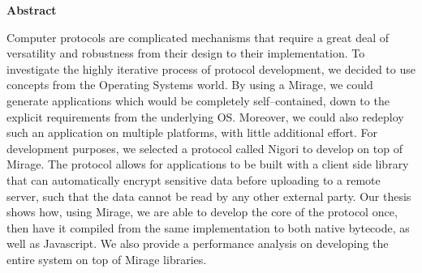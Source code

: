 \newpage
{\Huge \bf Abstract}
\vspace{24pt}

Computer protocols are complicated mechanisms that require a great deal of versatility and robustness from their design to their implementation.
To investigate the highly iterative process of protocol development, we decided to use concepts from the Operating Systems world.
By using a Mirage, we could generate applications which would be completely self--contained, down to the explicit requirements from the underlying OS.
Moreover, we could also redeploy such an application on multiple platforms, with little additional effort.
For development purposes, we selected a protocol called Nigori to develop on top of Mirage.
The protocol allows for applications to be built with a client side library that can automatically encrypt sensitive data before uploading to a remote server, such that the data cannot be read by any other external party.
Our thesis shows how, using Mirage, we are able to develop the core of the protocol once, then have it compiled from the same implementation to both native bytecode, as well as Javascript.
We also provide a performance analysis on developing the entire system on top of Mirage libraries.

\newpage
\vspace*{\fill}
